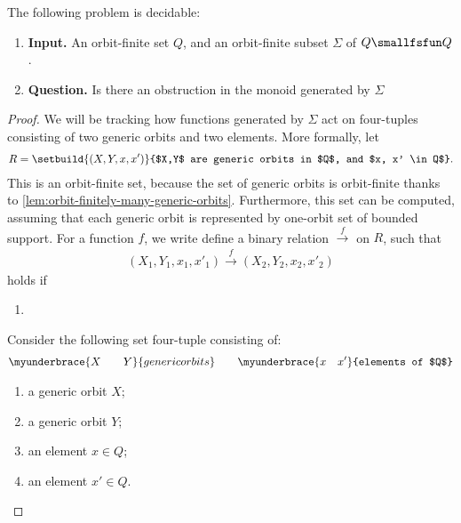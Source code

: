 
\begin{theorem}
    The following problem is decidable: 
    \begin{enumerate}
        \item \textbf{Input.} An orbit-finite set $Q$, and an orbit-finite subset $\Sigma$ of $Q \smallfsfun Q$.
        \item \textbf{Question.} Is there an obstruction in the  monoid generated by $\Sigma$
    \end{enumerate}
\end{theorem}
\begin{proof}
    We will be tracking how functions generated by $\Sigma$ act on four-tuples consisting of two generic orbits and two elements. More formally, let 
    \begin{align*}
    R = \setbuild{(X,Y,x,x')}{$X,Y$ are generic orbits in $Q$, and $x, x' \in Q$}.
    \end{align*}
    This is an orbit-finite set, because the set of generic orbits is orbit-finite thanks to \cref{lem:orbit-finitely-many-generic-orbits}. Furthermore, this set can be computed, assuming that each generic orbit is represented by one-orbit set of bounded support.  For a function $f$, we write define a binary relation $\stackrel f \to$ on $R$, such that 
    \begin{align*}
    (X_1,Y_1,x_1,x'_1) \stackrel f \to (X_2,Y_2,x_2,x'_2) 
    \end{align*}
    holds if 
    \begin{enumerate}
        \item 
    \end{enumerate}


    Consider the following set four-tuple consisting of: 
    \begin{align*}
    \myunderbrace{X \qquad Y}{generic orbits} 
    \qquad 
    \myunderbrace{x \quad x'}{elements of $Q$}
    \end{align*}
    \begin{enumerate}
        \item a generic orbit $X$;
        \item a generic orbit $Y$;
        \item an element $x \in Q$;
        \item an element $x' \in Q$.
    \end{enumerate}

\end{proof}